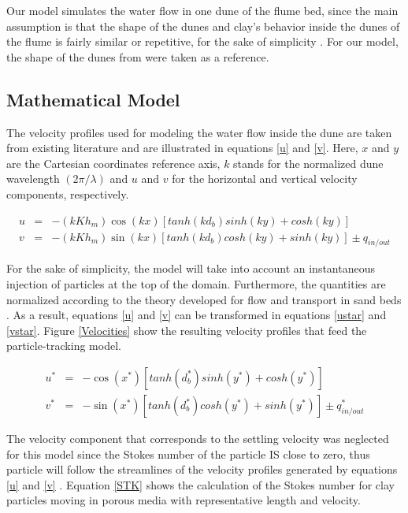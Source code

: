 \documentclass[draft,linenumbers]{agujournal2018}
\begin{document}
Our model simulates the water flow in one dune of the flume bed, since the main assumption is that the shape of the dunes and clay's behavior inside the dunes of the flume is fairly similar or repetitive, for the sake of simplicity \citep{Vanoni1974}. For our model, the shape of the dunes from \citet{Fox2014,Fox2018} were taken as a reference. 

\subsection{Mathematical Model} \label{Mathematical_model}

The velocity profiles used for modeling the water flow inside the dune are taken from existing literature \citep{Packman2000} and are illustrated in equations \ref{u} and \ref{v}. Here, $x$ and $y$ are the Cartesian coordinates reference axis, $k$ stands for the normalized dune wavelength $(2 \pi / \lambda)$ and $u$ and $v$ for the horizontal and vertical velocity components, respectively. 

\begin{eqnarray}
\label{u}
  u & = & -(kKh_{m}) \cos(kx) [tanh(kd_b)sinh(ky) + cosh(ky)] \\
\label{v}
  v & = & -(kKh_{m})\sin(kx) [tanh(kd_b)cosh(ky) + sinh(ky)] \pm q_{in/out} 
\end{eqnarray}

For the sake of simplicity, the model will take into account an instantaneous injection of particles at the top of the domain. Furthermore, the quantities are normalized according to the theory developed for flow and transport in sand beds \citep{Elliott1997,Packman2000}. As a result, equations \ref{u} and \ref{v} can be transformed in equations \ref{ustar} and \ref{vstar}. Figure \ref{Velocities} show the resulting velocity profiles that feed the particle-tracking model. 

\begin{eqnarray}
\label{ustar}
  u^* & = & -\cos(x^*)[tanh(d_b^*)sinh(y^*) + cosh(y^*)]\\
\label{vstar}
  v^* & = & -\sin(x^*)[tanh(d_b^*)cosh(y^*) + sinh(y^*)] \pm q_{in/out}^*
\end{eqnarray}

The velocity component that corresponds to the settling velocity was neglected for this model since the Stokes number of the particle IS close to zero, thus particle will follow the streamlines of the velocity profiles generated by equations \ref{u} and \ref{v} \citep{Clark2009}. Equation \ref{STK} shows the calculation of the Stokes number for clay particles moving in porous media with representative length and velocity. 
\end{document}
